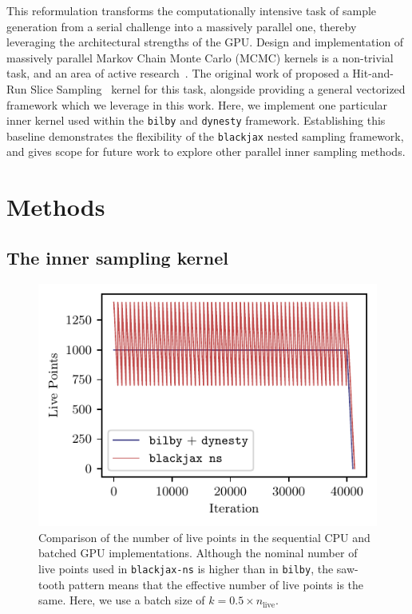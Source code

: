 \documentclass[fleqn,usenatbib]{mnras}
\begin{document}
This reformulation transforms the computationally intensive task of
sample generation from a serial challenge into a massively parallel one,
thereby leveraging the architectural strengths of the GPU. 
Design and implementation of massively parallel Markov Chain Monte Carlo 
(MCMC) kernels is a non-trivial task, and an area of active 
research~\citep{pmlr-v151-hoffman22a,pmlr-v130-hoffman21a}. 
The original work of \cite{yallup2025nested} proposed a 
Hit-and-Run Slice Sampling~\citep{Neal2003_slice} kernel for this task, 
alongside providing a general vectorized framework which we leverage in this work. 
Here, we implement one particular inner kernel used within the \texttt{bilby}
and \texttt{dynesty} framework.
Establishing this baseline demonstrates the flexibility of the \texttt{blackjax} 
nested sampling framework, and gives scope for future work to explore other 
parallel inner sampling methods.



\section{Methods}
\label{sec:methods}

\subsection{The inner sampling kernel}
\label{sec:methods_kernel}

\begin{figure}
    \centering
    \includegraphics{figures/nlive_comparison.pdf}
    \caption{Comparison of the number of live points in the sequential CPU and batched GPU implementations.
    Although the nominal number of live points used in \texttt{blackjax-ns} is higher than in \texttt{bilby},
    the saw-tooth pattern means that the effective number of live points is the same. Here, we use a batch size of $k = 0.5 \times n_{\text{live}}$.}
    \label{fig:nlive_comparison}
\end{figure}
\end{document}
